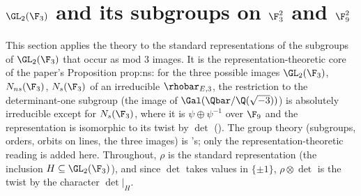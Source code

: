 \section{\texorpdfstring{$\GL_2(\F_3)$ and its subgroups on $\F_3^2$ and $\F_9^2$}{GL2(F3) and its subgroups over F3 and F9}}\label{sec:reps:gl23}

This section applies the theory to the standard representations of the subgroups of $\GL_2(\F_3)$ that occur as mod $3$ images. It is the
representation-theoretic core of the paper's Proposition prop:ns: for the three possible images $\GL_2(\F_3)$, $N_{ns}(\F_3)$, $N_s(\F_3)$ of
an irreducible $\rhobar_{E,3}$, the restriction to the determinant-one subgroup (the image of $\Gal(\Qbar/\Q(\sqrt{-3}))$) is absolutely
irreducible except for $N_s(\F_3)$, where it is $\psi\oplus\psi^{-1}$ over $\F_9$ and the representation is isomorphic to its twist by $\det$
(). The group theory (subgroups, orders, orbits on lines, the three images) is 's; only
the representation-theoretic reading is added here. Throughout, $\rho$ is the standard representation (the inclusion $H\subseteq\GL_2(\F_3)$),
and since $\det$ takes values in $\{\pm1\}$, $\rho\otimes\det$ is the twist by the character $\det|_H$.

